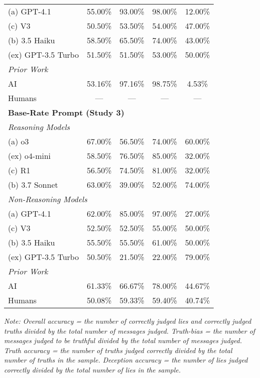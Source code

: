 \documentclass{article}
\begin{document}
\begin{table}[ht]
\begin{tabular}{lcccc}
(a) GPT-4.1 & 55.00\% & 93.00\% & 98.00\% & 12.00\% \\
(c) V3 & 50.50\% & 53.50\% & 54.00\% & 47.00\% \\
(b) 3.5 Haiku & 58.50\% & 65.50\% & 74.00\% & 43.00\% \\
(ex) GPT-3.5 Turbo & 51.50\% & 51.50\% & 53.00\% & 50.00\% \\
\midrule
\multicolumn{5}{l}{\textit{Prior Work}\citep{markowitz_generative_2024}} \\
AI & 53.16\% & 97.16\% & 98.75\% & 4.53\% \\
Humans & --- & --- & --- & --- \\
\midrule
\multicolumn{5}{l}{\textbf{Base-Rate Prompt (Study 3)}} \\
\midrule
\multicolumn{5}{l}{\textit{Reasoning Models}} \\
(a) o3 & 67.00\% & 56.50\% & 74.00\% & 60.00\% \\
(ex) o4-mini & 58.50\% & 76.50\% & 85.00\% & 32.00\% \\
(c) R1 & 56.50\% & 74.50\% & 81.00\% & 32.00\% \\
(b) 3.7 Sonnet & 63.00\% & 39.00\% & 52.00\% & 74.00\% \\
\midrule
\multicolumn{5}{l}{\textit{Non-Reasoning Models}} \\
(a) GPT-4.1 & 62.00\% & 85.00\% & 97.00\% & 27.00\% \\
(c) V3 & 52.50\% & 52.50\% & 55.00\% & 50.00\% \\
(b) 3.5 Haiku & 55.50\% & 55.50\% & 61.00\% & 50.00\% \\
(ex) GPT-3.5 Turbo & 50.50\% & 21.50\% & 22.00\% & 79.00\% \\
\midrule
\multicolumn{5}{l}{\textit{Prior Work}\citep{markowitz_generative_2024}} \\
AI & 61.33\% & 66.67\% & 78.00\% & 44.67\% \\
Humans & 50.08\% & 59.33\% & 59.40\% & 40.74\% \\
\bottomrule
\end{tabular}
\label{tab:all_models}
\footnotetext{}
\parbox[t]{\linewidth}{\footnotesize \textit{Note: Overall accuracy = the number of correctly judged lies and correctly judged truths divided by the total number of messages judged. Truth-bias = the number of messages judged to be truthful divided by the total number of messages judged. Truth accuracy = the number of truths judged correctly divided by the total number of truths in the sample. Deception accuracy = the number of lies judged correctly divided by the total number of lies in the sample.}}
\end{table}
\normalsize
\end{document}
